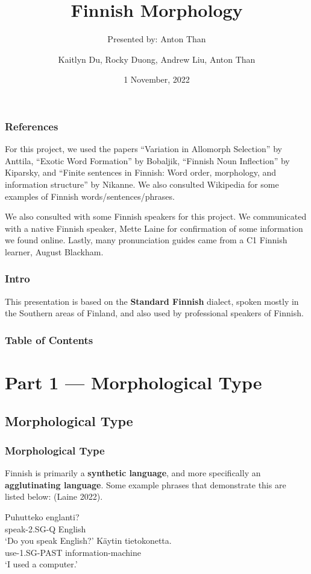 \documentclass{beamer}
\title[Project Presentation] %
{Finnish Morphology}
\subtitle{Presented by: Anton Than}
\author{Kaitlyn Du, Rocky Duong, Andrew Liu, Anton Than}
\date {1 November, 2022}
\begin{document}
\renewcommand\thefootnote{\relax}

\frame{\titlepage}

\begin{frame}
	\frametitle{References}
	For this project, we used the papers ``Variation in Allomorph Selection'' by Anttila, ``Exotic Word Formation'' by Bobaljik, ``Finnish Noun Inflection'' by Kiparsky, and ``Finite sentences in Finnish: Word order, morphology, and information structure'' by Nikanne. We also consulted Wikipedia for some examples of Finnish words/sentences/phrases.

	We also consulted with some Finnish speakers for this project. We communicated with a native Finnish speaker, Mette Laine for confirmation of some information we found online. Lastly, many pronunciation guides came from a C1 Finnish learner, August Blackham.
\end{frame}

\begin{frame}
	\frametitle{Intro}
	{\large This presentation is based on the \textbf{Standard Finnish} dialect, spoken mostly in the Southern areas of Finland, and also used by professional speakers of Finnish.}
\end{frame}

\begin{frame}
\frametitle{Table of Contents}
\tableofcontents
\end{frame}

\section{Part 1 --- Morphological Type}

\subsection{Morphological Type}

\begin{frame}
	\frametitle{Morphological Type}
     \begin{center}
         Finnish is primarily a \textbf{synthetic language}, and more specifically an \textbf{agglutinating language}. Some example phrases that demonstrate this are listed below: (Laine 2022).
     \end{center}
     
     \begin{exe}
         \ex
         \gll Puhutteko englanti?\\
         {speak-2.SG-Q} {English}\\
         \glt `Do you speak English?'
         \ex
         \gll Käytin tietokonetta.\\
         {use-1.SG-PAST} {information-machine}\\
         \glt `I used a computer.'
     \end{exe}

\end{frame}
\end{document}
